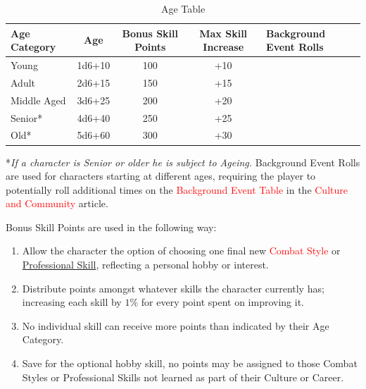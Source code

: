 \documentclass[10pt]{article}
\begin{document}
\begin{table}[h!]
    \centering
    \caption{Age Table}
    \label{tab:age}
    \begin{tabular}{|l|c|c|c|}
        \hline
        \textbf{Age Category} & \textbf{Age} & \textbf{Bonus Skill Points} & \textbf{Max Skill Increase} & \textbf{Background Event Rolls}  \\
        \hline
        Young                 & 1d6+10        & 100                         & +10                         \\
        Adult                 & 2d6+15        & 150                         & +15                         \\
        Middle Aged           & 3d6+25        & 200                         & +20                         \\
        Senior*               & 4d6+40        & 250                         & +25                         \\
        Old*                  & 5d6+60        & 300                         & +30                         \\
        \hline
    \end{tabular}
\end{table}
\tabto{12cm}*\textit{If a character is Senior or older he is subject to Ageing.}
Background Event Rolls are used for characters starting at different ages, requiring the player to potentially roll additional times on the \textcolor{red}{Background Event Table} in the \textcolor{red}{Culture and Community} article.

Bonus Skill Points are used in the following way:
\begin{enumerate}
    \item Allow the character the option of choosing one final new \textcolor{red}{Combat Style} or \hyperref[sec:skill_table]{Professional Skill}, reflecting a personal hobby or interest.
    \item Distribute points amongst whatever skills the character currently has; increasing each skill by \(1\%\) for every point spent on improving it.
    \item No individual skill can receive more points than indicated by their Age Category.
    \item Save for the optional hobby skill, no points may be assigned to those Combat Styles or Professional Skills not learned as part of their Culture or Career.
\end{enumerate}
\end{document}
